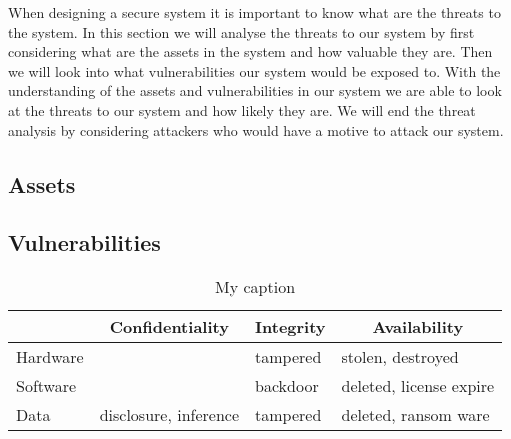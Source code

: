 \begin{comment}
on the security of log entries pre-dating the compromise of a logging machine.
Consequently, we require forward-secure stream integrity, that is, resistance
against post-compromise insertion, alteration, deletion and reordering of pre-
compromise log entries.
Traditional log integrity techniques involve using specialized write-only hard
disks or remote logging whereby copies of log entries are sent to several geo-
graphically distributed machines. With the former, disk substitution can result
in a complete integrity compromise of the entire log. In the latter, the remote
server may go offline (or become unreachable) and the logging machine then
ACM Transactions on Storage, Vol. 5, No. 1, Article 2, Publication date: March 2009.A New Approach to Secure Logging
has to locally buffer new log entries, which, in turn, become subject to attacks.
Furthermore, if the remote server is compromised, log file integrity cannot be
guaranteed.
\end{comment}
When designing a secure system it is important to know what are the threats to the system. In this section we will analyse the threats to our system by first considering what are the assets in the system and how valuable they are. Then we will look into what vulnerabilities our system would be exposed to. With the understanding of the assets and vulnerabilities in our system we are able to look at the threats to our system and how likely they are. We will end the threat analysis by considering attackers who would have a motive to attack our system.
\subsection{Assets}

\subsection{Vulnerabilities}
\begin{table}[h!]
\centering
\caption{My caption}
\label{my-label}
\begin{tabular}{l|l|l|l}
\multicolumn{1}{c|}{} & \multicolumn{1}{c|}{Confidentiality} & \multicolumn{1}{c|}{Integrity} & \multicolumn{1}{c}{Availability} \\ \hline
Hardware              &                                      & tampered                       & stolen, destroyed                \\ \hline
Software              &                                      & backdoor                       & deleted, license expire          \\ \hline
Data                  & disclosure, inference                & tampered                       & deleted, ransom ware            
\end{tabular}
\end{table}
